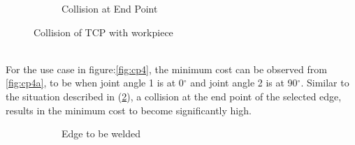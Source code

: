 \begin{figure}[!htbp]
\begin{subfigure}[b]{0.4\textwidth}
		\caption{Collision at End Point}  
		\label{fig:collg}
	\end{subfigure}	
	\caption{Collision of TCP with workpiece}
	\label{fig:coll}
\end{figure}\\
For the use case in figure:\ref{fig:cp4}, the minimum cost can be observed from \ref{fig:cp4a}, to be when joint angle 1 is at 0$^{\circ}$ and joint angle 2 is at 90$^{\circ}$. Similar to the situation described in (\ref{fig:coll}), a collision at the end point of the selected edge, results in the minimum cost to become significantly high.
\begin{figure}[!htbp] %
	\centering
	\begin{subfigure}[b]{0.4\textwidth}
		\caption{Edge to be welded}  
		\label{fig:cp4b}
	\end{subfigure}
	\begin{subfigure}[b]{0.4\textwidth}

\end{subfigure}
\end{figure}
